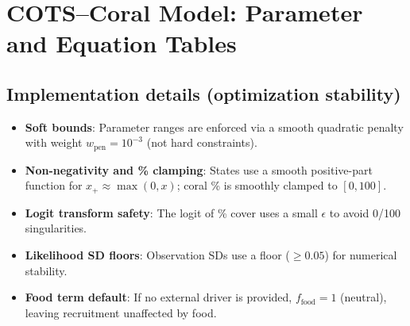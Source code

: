 \newpage
\section*{COTS--Coral Model: Parameter and Equation Tables}

\subsection*{Implementation details (optimization stability)}
\begin{itemize}
  \item \textbf{Soft bounds}: Parameter ranges are enforced via a smooth quadratic penalty with weight $w_{\text{pen}}=10^{-3}$ (not hard constraints).
  \item \textbf{Non-negativity and \% clamping}: States use a smooth positive-part function for $x_+ \approx \max(0,x)$; coral \% is smoothly clamped to $[0,100]$.
  \item \textbf{Logit transform safety}: The logit of \% cover uses a small $\epsilon$ to avoid 0/100 singularities.
  \item \textbf{Likelihood SD floors}: Observation SDs use a floor ($\ge 0.05$) for numerical stability.
  \item \textbf{Food term default}: If no external driver is provided, $f_{\text{food}}=1$ (neutral), leaving recruitment unaffected by food.
\end{itemize}

